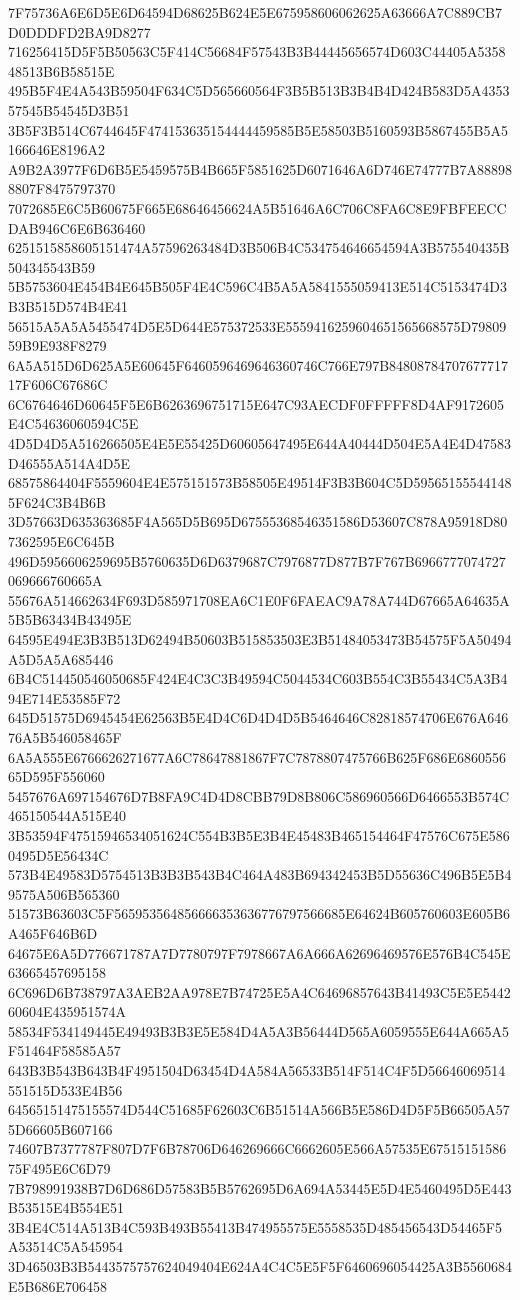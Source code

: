 {{{{{{{{{{{{{{{{{{{{{7F75736A6E6D5E6D64594D68625B624E5E675958606062625A63666A7C889CB7D0DDDFD2BA9D8277
716256415D5F5B50563C5F414C56684F57543B3B44445656574D603C44405A535848513B6B58515E
495B5F4E4A543B59504F634C5D565660564F3B5B513B3B4B4D424B583D5A435357545B54545D3B51
3B5F3B514C6744645F474153635154444459585B5E58503B5160593B5867455B5A5166646E8196A2
A9B2A3977F6D6B5E5459575B4B665F5851625D6071646A6D746E74777B7A888988807F8475797370
7072685E6C5B60675F665E68646456624A5B51646A6C706C8FA6C8E9FBFEECCDAB946C6E6B636460
6251515858605151474A57596263484D3B506B4C534754646654594A3B575540435B504345543B59
5B5753604E454B4E645B505F4E4C596C4B5A5A5841555059413E514C5153474D3B3B515D574B4E41
56515A5A5A5455474D5E5D644E575372533E5559416259604651565668575D7980959B9E938F8279
6A5A515D6D625A5E60645F6460596469646360746C766E797B8480878470767771717F606C67686C
6C6764646D60645F5E6B6263696751715E647C93AECDF0FFFFF8D4AF9172605E4C54636060594C5E
4D5D4D5A516266505E4E5E55425D60605647495E644A40444D504E5A4E4D47583D46555A514A4D5E
68575864404F5559604E4E575151573B58505E49514F3B3B604C5D595651555441485F624C3B4B6B
3D57663D635363685F4A565D5B695D67555368546351586D53607C878A95918D807362595E6C645B
496D5956606259695B5760635D6D6379687C7976877D877B7F767B6966777074727069666760665A
55676A514662634F693D585971708EA6C1E0F6FAEAC9A78A744D67665A64635A5B5B63434B43495E
64595E494E3B3B513D62494B50603B515853503E3B51484053473B54575F5A50494A5D5A5A685446
6B4C514450546050685F424E4C3C3B49594C5044534C603B554C3B55434C5A3B494E714E53585F72
645D51575D6945454E62563B5E4D4C6D4D4D5B5464646C82818574706E676A64676A5B546058465F
6A5A555E6766626271677A6C78647881867F7C7878807475766B625F686E686055665D595F556060
5457676A697154676D7B8FA9C4D4D8CBB79D8B806C586960566D6466553B574C465150544A515E40
3B53594F47515946534051624C554B3B5E3B4E45483B465154464F47576C675E5860495D5E56434C
573B4E49583D5754513B3B3B543B4C464A483B694342453B5D55636C496B5E5B49575A506B565360
51573B63603C5F565953564856666353636776797566685E64624B605760603E605B6A465F646B6D
64675E6A5D776671787A7D7780797F7978667A6A666A62696469576E576B4C545E63665457695158
6C696D6B738797A3AEB2AA978E7B74725E5A4C64696857643B41493C5E5E544260604E435951574A
58534F534149445E49493B3B3E5E584D4A5A3B56444D565A6059555E644A665A5F51464F58585A57
643B3B543B643B4F4951504D63454D4A584A56533B514F514C4F5D56646069514551515D533E4B56
64565151475155574D544C51685F62603C6B51514A566B5E586D4D5F5B66505A575D66605B607166
74607B7377787F807D7F6B78706D646269666C6662605E566A57535E6751515158675F495E6C6D79
7B798991938B7D6D686D57583B5B5762695D6A694A53445E5D4E5460495D5E443B53515E4B554E51
3B4E4C514A513B4C593B493B55413B474955575E5558535D485456543D54465F5A53514C5A545954
3D46503B3B5443575757624049404E624A4C4C5E5F5F6460696054425A3B5560684E5B686E706458
}}}}}}}}}}}}}}}}}}}}}
